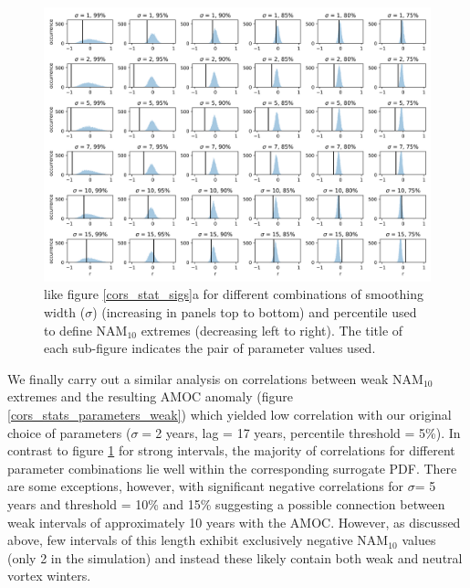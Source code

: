 \newpage
\begin{landscape}
\begin{figure}[h!]
\begin{center}
\noindent\includegraphics[width =0.9\linewidth]{Figures/Figures-surface/cors_sigs_thresh_and_sigma.png} 
\caption[PDFs for strong NAM$_{10}$ extreme vs AMOC for different $\sigma$/threshold]{like figure \ref{cors_stat_sigs}a for different combinations of smoothing width ($\sigma$) (increasing in panels top to bottom) and percentile used to define NAM$_{10}$ extremes (decreasing left to right). The title of each sub-figure indicates the pair of parameter values used.}%
\label{cors_stats_parameters_strong}
\end{center}
\end{figure}
\end{landscape}

We finally carry out a similar analysis on correlations between weak NAM$_{10}$ extremes and the resulting AMOC anomaly (figure \ref{cors_stats_parameters_weak}) which yielded low correlation with our original choice of parameters ($\sigma =$2 years, lag = 17 years, percentile threshold = 5\%). In contrast to figure \ref{cors_stats_parameters_strong} for strong intervals, the majority of correlations for different parameter combinations lie well within the corresponding surrogate PDF. There are some exceptions, however, with significant negative correlations for $\sigma$= 5 years and threshold = 10\% and 15\% suggesting a possible connection between weak intervals of approximately 10 years with the AMOC. However, as discussed above, few intervals of this length exhibit exclusively negative NAM$_{10}$ values (only 2 in the simulation) and instead these likely contain both weak and neutral vortex winters. 

